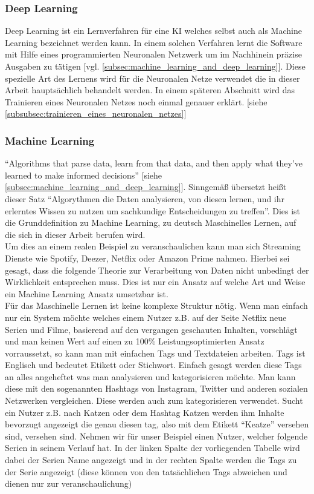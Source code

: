         \subsubsection{Deep Learning}
        \label{subsubsec:deep_learning}
            Deep Learning ist ein Lernverfahren für eine KI welches selbst auch als Machine Learning bezeichnet werden kann. In einem solchen Verfahren lernt die Software mit Hilfe eines programmierten Neuronalen Netzwerk um im Nachhinein präzise Ausgaben zu tätigen [vgl. \ref{subsec:machine_learning_and_deep_learning}]. Diese spezielle Art des Lernens wird für die Neuronalen Netze verwendet die in dieser Arbeit hauptsächlich behandelt werden. In einem späteren Abschnitt wird das Trainieren eines Neuronalen Netzes noch einmal genauer erklärt. [siehe \ref{subsubsec:trainieren_eines_neuronalen_netzes}]

        \subsubsection{Machine Learning}
        \label{subsubsec:machnine_learning}
            \enquote{Algorithms that parse data, learn from that data, and then apply what they’ve learned to make informed decisions} [siehe \ref{subsec:machine_learning_and_deep_learning}]. Sinngemäß übersetzt heißt dieser Satz \enquote{Algorythmen die Daten analysieren, von diesen lernen, und ihr erlerntes Wissen zu nutzen um sachkundige Entscheidungen zu treffen}. Dies ist die Grunddefinition zu Machine Learning, zu deutsch Maschinelles Lernen, auf die sich in dieser Arbeit berufen wird.\\
            Um dies an einem realen Beispiel zu veranschaulichen kann man sich Streaming Dienste wie Spotify, Deezer, Netflix oder Amazon Prime nahmen. Hierbei sei gesagt, dass die folgende Theorie zur Verarbeitung von Daten nicht unbedingt der Wirklichkeit entsprechen muss. Dies ist nur ein Ansatz auf welche Art und Weise ein Machine Learning Ansatz umsetzbar ist.\\

            Für das Maschinelle Lernen ist keine komplexe Struktur nötig. Wenn man einfach nur ein System möchte welches einem Nutzer z.B. auf der Seite Netflix neue Serien und Filme, basierend auf den vergangen geschauten Inhalten, vorschlägt und man keinen Wert auf einen zu 100\% Leistungsoptimierten Ansatz vorraussetzt, so kann man mit einfachen Tags und Textdateien arbeiten. Tags ist Englisch und bedeutet Etikett oder Stichwort. Einfach gesagt werden diese Tags an alles angeheftet was man analysieren und kategorisieren möchte. Man kann diese mit den sogenannten Hashtags von Instagram, Twitter und anderen sozialen Netzwerken vergleichen. Diese werden auch zum kategorisieren verwendet. Sucht ein Nutzer z.B. nach Katzen oder dem Hashtag Katzen werden ihm Inhalte bevorzugt angezeigt die genau diesen tag, also mit dem Etikett \enquote{Keatze} versehen sind, versehen sind. Nehmen wir für unser Beispiel einen Nutzer, welcher folgende Serien in seinem Verlauf hat. In der linken Spalte der vorliegenden Tabelle wird dabei der Serien Name angezeigt und in der rechten Spalte werden die Tags zu der Serie angezeigt (diese können von den tatsächlichen Tags abweichen und dienen nur zur veranschaulichung)
            
